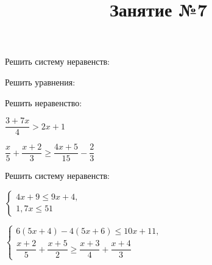 %	
%	
\newpage
\title{Занятие №7}
\begin{listofex}
	\item {}
	\item {}
	\item {}
	\item Решить систему неравенств:
	\begin{enumcols}[itemcolumns=2]
		\item {}
		\item {}
	\end{enumcols}
	\item Решить уравнения:
	\begin{enumcols}[itemcolumns=2]
		\item {}
		\item {}
	\end{enumcols}
	\item Решить неравенство:
	\begin{enumcols}[itemcolumns=2]
		\item \( \dfrac{3+7x}{4}>2x+1 \) 
		\item \( \dfrac{x}{5}+\dfrac{x+2}{3}\ge\dfrac{4x+5}{15}-\dfrac{2}{3} \) 
	\end{enumcols}
	\item Решить систему неравенств:
	\begin{enumcols}[itemcolumns=2]
		\item \( \left\{
		\begin{array}{l}
			4x+9\le9x+4,\\
			1,7x\le51
		\end{array}
		\right. \) \answer{\( [1;30] \)}
		\item \( \left\{
		\begin{array}{l}
			6(5x+4)-4(5x+6)\le10x+11,\\
			\dfrac{x+2}{5}+\dfrac{x+5}{2}\ge\dfrac{x+3}{4}+\dfrac{x+4}{3}
		\end{array}
		\right. \) \answer{\( [-7;+\infty) \)}
	\end{enumcols}

	
\end{listofex}
